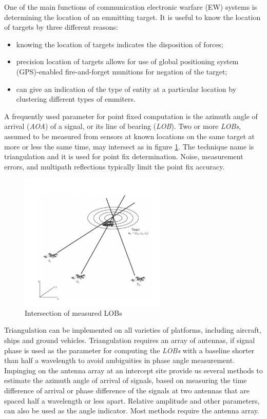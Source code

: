 \documentclass[english,purist]{ist-report}
\begin{document}
One of the main functions of communication electronic warfare (EW) systems is determining the location of an emmitting target. 
It is useful to know the location of targets by three different reasons:

\begin{itemize}
    \item knowing the location of targets indicates the disposition of forces;
    \item precision location of targets allows for use of global positioning system (GPS)-enabled fire-and-forget munitions for negation of the target;
    \item can give an indication of the type of entity at a particular location by clustering different types of emmiters. 
\end{itemize}

A frequently used parameter for point fixed computation is the azimuth angle of arrival (\textit{AOA}) of a signal, or its line of bearing (\textit{LOB}). Two or more \textit{LOBs}, assumed to be measured from sensors at known locations on the same target at more or less the same time, may intersect as in figure \ref{target1}. The technique name is triangulation and it is used for point fix determination. 
Noise, measurement errors, and multipath reflections typically limit the point fix accuracy. 

\begin{figure}[ht]
\centering
\includegraphics[width=70mm]{target1.png}
\caption{Intersection of measured LOBs}
\label{target1}
\end{figure} 

Triangulation can be implemented on all varieties of platforms, including aircraft, ships and ground vehicles. Triangulation requires an array of antennas, if signal phase is used as the parameter for computing the \textit{LOBs} with a baseline shorter than half a wavelength to avoid ambiguities in phase angle measurement.
Impinging on the antenna array at an intercept site provide us several methods to estimate the azimuth angle of arrival of signals, based on measuring the time difference of arrival or phase difference of the signals at two antennas that are spaced half a wavelength or less apart. Relative amplitude and other parameters, can also be used as the angle indicator. Most methods require the antenna array. 
\end{document}
